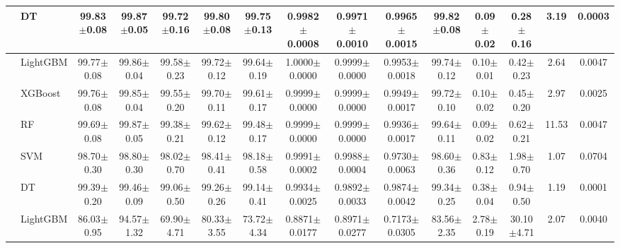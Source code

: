 \begin{tabular}{@{}llccccccccccccc@{}}
 & DT & 99.83{\tiny$\pm$0.08} & 99.87{\tiny$\pm$0.05} & 99.72{\tiny$\pm$0.16} & 99.80{\tiny$\pm$0.08} & 99.75{\tiny$\pm$0.13} & 0.9982{\tiny$\pm$0.0008} & 0.9971{\tiny$\pm$0.0010} & 0.9965{\tiny$\pm$0.0015} & 99.82{\tiny$\pm$0.08} & 0.09{\tiny$\pm$0.02} & 0.28{\tiny$\pm$0.16} & 3.19 & 0.0003\\
\midrule
{} & LightGBM & 99.77{\tiny$\pm$0.08} & 99.86{\tiny$\pm$0.04} & 99.58{\tiny$\pm$0.23} & 99.72{\tiny$\pm$0.12} & 99.64{\tiny$\pm$0.19} & 1.0000{\tiny$\pm$0.0000} & 0.9999{\tiny$\pm$0.0000} & 0.9953{\tiny$\pm$0.0018} & 99.74{\tiny$\pm$0.12} & 0.10{\tiny$\pm$0.01} & 0.42{\tiny$\pm$0.23} & 2.64 & 0.0047\\
 & XGBoost & 99.76{\tiny$\pm$0.08} & 99.85{\tiny$\pm$0.04} & 99.55{\tiny$\pm$0.20} & 99.70{\tiny$\pm$0.11} & 99.61{\tiny$\pm$0.17} & 0.9999{\tiny$\pm$0.0000} & 0.9999{\tiny$\pm$0.0000} & 0.9949{\tiny$\pm$0.0017} & 99.72{\tiny$\pm$0.10} & 0.10{\tiny$\pm$0.02} & 0.45{\tiny$\pm$0.20} & 2.97 & 0.0025\\
 & RF & 99.69{\tiny$\pm$0.08} & 99.87{\tiny$\pm$0.05} & 99.38{\tiny$\pm$0.21} & 99.62{\tiny$\pm$0.12} & 99.48{\tiny$\pm$0.17} & 0.9999{\tiny$\pm$0.0000} & 0.9999{\tiny$\pm$0.0000} & 0.9936{\tiny$\pm$0.0017} & 99.64{\tiny$\pm$0.11} & 0.09{\tiny$\pm$0.02} & 0.62{\tiny$\pm$0.21} & 11.53 & 0.0047\\
 & SVM & 98.70{\tiny$\pm$0.30} & 98.80{\tiny$\pm$0.30} & 98.02{\tiny$\pm$0.70} & 98.41{\tiny$\pm$0.41} & 98.18{\tiny$\pm$0.58} & 0.9991{\tiny$\pm$0.0002} & 0.9988{\tiny$\pm$0.0004} & 0.9730{\tiny$\pm$0.0063} & 98.60{\tiny$\pm$0.36} & 0.83{\tiny$\pm$0.12} & 1.98{\tiny$\pm$0.70} & 1.07 & 0.0704\\
 & DT & 99.39{\tiny$\pm$0.20} & 99.46{\tiny$\pm$0.09} & 99.06{\tiny$\pm$0.50} & 99.26{\tiny$\pm$0.26} & 99.14{\tiny$\pm$0.41} & 0.9934{\tiny$\pm$0.0025} & 0.9892{\tiny$\pm$0.0033} & 0.9874{\tiny$\pm$0.0042} & 99.34{\tiny$\pm$0.25} & 0.38{\tiny$\pm$0.04} & 0.94{\tiny$\pm$0.50} & 1.19 & 0.0001\\
\midrule
{} & LightGBM & 86.03{\tiny$\pm$0.95} & 94.57{\tiny$\pm$1.32} & 69.90{\tiny$\pm$4.71} & 80.33{\tiny$\pm$3.55} & 73.72{\tiny$\pm$4.34} & 0.8871{\tiny$\pm$0.0177} & 0.8971{\tiny$\pm$0.0277} & 0.7173{\tiny$\pm$0.0305} & 83.56{\tiny$\pm$2.35} & 2.78{\tiny$\pm$0.19} & 30.10{\tiny$\pm$4.71} & 2.07 & 0.0040\\

\end{tabular}
